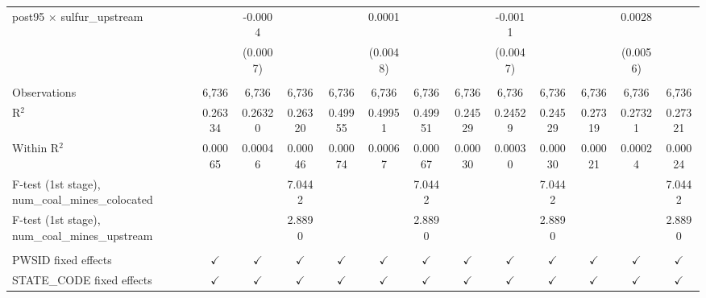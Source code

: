 \begin{table}[htbp]
\begin{adjustbox}{width = \textwidth, center}
\begin{tabular}{lcccccccccccc}
         post95 $\times$ sulfur\_upstream                   &                       & -0.0004       &               &               & 0.0001        &               &               & -0.0011       &               &               & 0.0028        &   \\   
                                                            &                       & (0.0007)      &               &               & (0.0048)      &               &               & (0.0047)      &               &               & (0.0056)      &   \\   
          \\
         Observations                                       & 6,736                 & 6,736         & 6,736         & 6,736         & 6,736         & 6,736         & 6,736         & 6,736         & 6,736         & 6,736         & 6,736         & 6,736\\  
         R$^2$                                              & 0.26334               & 0.26320       & 0.26320       & 0.49955       & 0.49951       & 0.49951       & 0.24529       & 0.24529       & 0.24529       & 0.27319       & 0.27321       & 0.27321\\  
         Within R$^2$                                       & 0.00065               & 0.00046       & 0.00046       & 0.00074       & 0.00067       & 0.00067       & 0.00030       & 0.00030       & 0.00030       & 0.00021       & 0.00024       & 0.00024\\  
         F-test (1st stage), num\_coal\_mines\_colocated    &                       &               & 7.0442        &               &               & 7.0442        &               &               & 7.0442        &               &               & 7.0442\\  
         F-test (1st stage), num\_coal\_mines\_upstream     &                       &               & 2.8890        &               &               & 2.8890        &               &               & 2.8890        &               &               & 2.8890\\  
          \\
         PWSID fixed effects                                & $\checkmark$          & $\checkmark$  & $\checkmark$  & $\checkmark$  & $\checkmark$  & $\checkmark$  & $\checkmark$  & $\checkmark$  & $\checkmark$  & $\checkmark$  & $\checkmark$  & $\checkmark$\\   
         STATE\_CODE fixed effects                          & $\checkmark$          & $\checkmark$  & $\checkmark$  & $\checkmark$  & $\checkmark$  & $\checkmark$  & $\checkmark$  & $\checkmark$  & $\checkmark$  & $\checkmark$  & $\checkmark$  & $\checkmark$\\   

\end{tabular}
\end{adjustbox}
\end{table}
